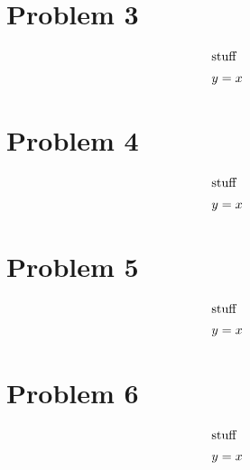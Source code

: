 \documentclass[12pt]{article}
\begin{document}
\newpage
\section*{Problem 3}

\begin{align} 
    \intertext{stuff}
    y&=x
\end{align}


\newpage
\section*{Problem 4}

\begin{align} 
    \intertext{stuff}
    y&=x
\end{align}



\newpage
\section*{Problem 5}

\begin{align} 
    \intertext{stuff}
    y&=x
\end{align}


\section*{Problem 6}

\begin{align} 
    \intertext{stuff}
    y&=x
\end{align}



\end{document}
